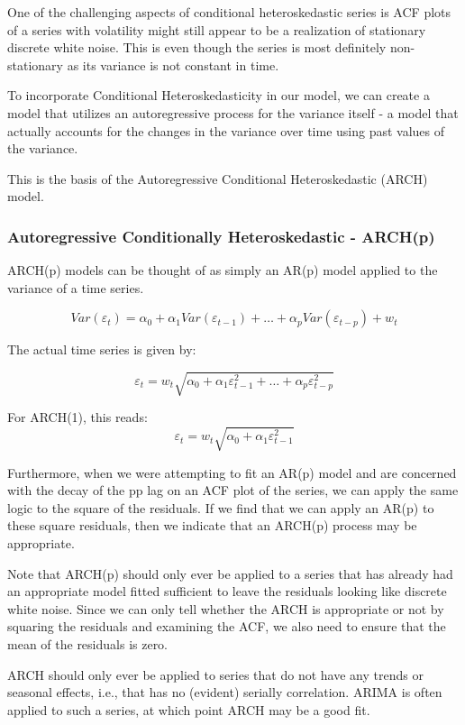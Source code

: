One of the challenging aspects of conditional heteroskedastic series is ACF plots of a series with volatility might still appear to be a realization of stationary discrete white noise. This is even though the series is most definitely non-stationary as its variance is not constant in time.

To incorporate Conditional Heteroskedasticity in our model, we can create a model that utilizes an autoregressive process for the variance itself - a model that actually accounts for the changes in the variance over time using past values of the variance.

This is the basis of the Autoregressive Conditional Heteroskedastic (ARCH) model.
\\
     	\subsubsection {Autoregressive Conditionally Heteroskedastic - ARCH(p)}
ARCH(p) models can be thought of as simply an AR(p) model applied to the variance of a time series.

$$Var(\varepsilon_t) = \alpha_0 + \alpha_1Var(\varepsilon_{t-1})+…+\alpha_pVar(\varepsilon_{t-p})+w_t$$

The actual time series is given by:

$$\varepsilon_t = w_t\sqrt{\alpha_0 + \alpha_1\varepsilon_{t-1}^2+…+\alpha_p\varepsilon_{t-p}^2}$$

For ARCH(1), this reads:
$$\varepsilon_t = w_t\sqrt{\alpha_0+\alpha_1\varepsilon_{t-1}^2}$$

Furthermore, when we were attempting to fit an AR(p) model and are concerned with the decay of the pp lag on an ACF plot of the series, we can apply the same logic to the square of the residuals. If we find that we can apply an AR(p) to these square residuals, then we indicate that an ARCH(p) process may be appropriate.

Note that ARCH(p) should only ever be applied to a series that has already had an appropriate model fitted sufficient to leave the residuals looking like discrete white noise. Since we can only tell whether the ARCH is appropriate or not by squaring the residuals and examining the ACF, we also need to ensure that the mean of the residuals is zero.

ARCH should only ever be applied to series that do not have any trends or seasonal effects, i.e., that has no (evident) serially correlation. ARIMA is often applied to such a series, at which point ARCH may be a good fit.
\\
